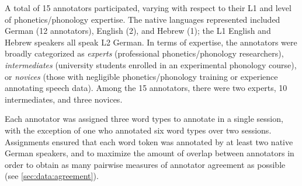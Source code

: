 \documentclass[a4paper]{article}
\begin{document}
		A total of 15 annotators participated, varying with respect to their L1 and level of phonetics/phonology expertise. 
		The native languages represented included German (12 annotators), English (2), and Hebrew (1); the L1 English and Hebrew speakers all speak L2 German. 
		In terms of expertise, the annotators were broadly categorized as \textit{experts} (professional phonetics/phonology researchers), \textit{intermediates} (university students enrolled in an experimental phonology course), or \textit{novices} (those with negligible phonetics/phonology training or experience annotating speech data). Among the 15 annotators, there were two experts, 10 intermediates, and three novices. 		


		
		
		Each annotator was assigned three word types to annotate in a single session, with the exception of one who annotated six word types over two sessions. 
		Assignments ensured that each word token was annotated by at least two native German speakers, and to maximize the amount of overlap between annotators in order to obtain as many pairwise measures of annotator agreement as possible 
		(see \cref{sec:data:agreement}).
		
\end{document}
